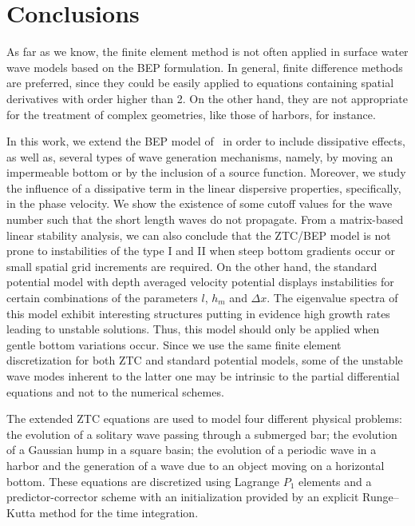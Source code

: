 \enlargethispage{6pt}

\section{Conclusions}

As far as we know, the finite element method is not often applied in
surface water wave models based on the BEP formulation.  In general,
finite difference methods are preferred, since they could be easily
applied to equations containing spatial derivatives with order higher
than 2.  On the other hand, they are not appropriate for the treatment
of complex geometries, like those of harbors, for instance.

In this work, we extend the BEP model of~\citet{ZhaoTengCheng2004} in
order to include dissipative effects, as well as, several types of
wave generation mechanisms, namely, by moving an impermeable bottom or
by the inclusion of a source function.  Moreover, we study the
influence of a dissipative term in the linear dispersive properties,
specifically, in the phase velocity.  We show the existence of some
cutoff values for the wave number such that the short length waves do
not propagate.  From a matrix-based linear stability analysis, we can
also conclude that the ZTC/BEP model is not prone to instabilities of
the type I and II when steep bottom gradients occur or small spatial
grid increments are required.  On the other hand, the standard
potential model with depth averaged velocity potential displays
instabilities for certain combinations of the parameters $l$, $h_m$
and $\Delta x$. The eigenvalue spectra of this model exhibit
interesting structures putting in evidence high growth rates leading
to unstable solutions. Thus, this model should only be applied when
gentle bottom variations occur.  Since we use the same finite element
discretization for both ZTC and standard potential models, some of the
unstable wave modes inherent to the latter one may be intrinsic to the
partial differential equations and not to the numerical schemes.

The extended ZTC equations are used to model four different physical
problems: the evolution of a solitary wave passing through a submerged
bar; the evolution of a Gaussian hump in a square basin; the evolution
of a periodic wave in a harbor and the generation of a wave due to an
object moving on a horizontal bottom.  These equations are discretized
using Lagrange $P_1$ elements and a predictor-corrector scheme with an
initialization provided by an explicit Runge--Kutta method for the
time integration.


